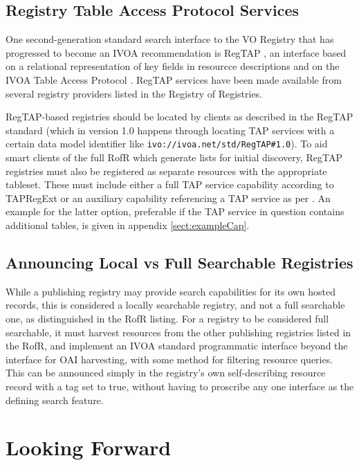 \documentclass{ivoa}
\begin{document}
\subsection{Registry Table Access Protocol Services}
\label{RegTAP}

One second-generation standard search interface to the VO Registry that
has progressed to become an IVOA recommendation is RegTAP
\citep{std:RegTAP}, an interface based on a relational representation of
key fields in resourcce descriptions and on the IVOA Table Access Protocol 
\citep{std:TAP}. RegTAP services have been made available from several 
registry providers listed in the Registry of Registries.

RegTAP-based registries should be located by clients as described 
in the RegTAP standard (which in version 1.0 happens through locating 
TAP services with a certain data model identifier like 
\nolinkurl{ivo://ivoa.net/std/RegTAP#1.0}).  To aid smart clients of
the full RofR which generate lists for initial discovery, RegTAP registries 
must also be registered as separate resources with the appropriate tableset.  
These must include either a full TAP service capability according to
TAPRegExt \citep{std:TAPREGEXT-20120827} or an auxiliary capability
referencing a TAP service as per \citet{note:DataCollect}.  An example
for the latter option, preferable if the TAP service in question
contains additional tables, is given in appendix \ref{sect:exampleCap}.

\subsection{Announcing Local vs Full Searchable Registries}
\label{FullSearch}

While a publishing registry may provide search capabilities for its
own hosted records, this is considered a locally searchable registry,
and not a full searchable one, as distinguished in the RofR listing. 
For a registry to be considered full searchable, it must harvest resources 
from the other publishing  registries listed in the RofR, and implement 
an IVOA standard programmatic interface beyond the interface for OAI harvesting,
with some method for filtering resource queries. 
This can be announced simply in the registry's own self-describing resource
record with a  tag set to true, without having to proscribe any 
one interface as the defining search feature.

\section{Looking Forward}
\label{LookingForward}
\end{document}
